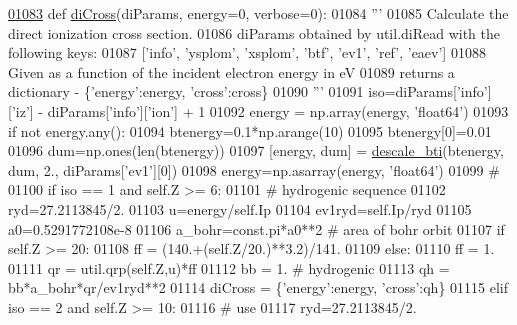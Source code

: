 \begin{DoxyCode}
\hypertarget{namespacepyneb_1_1utils_1_1__chianti__tools_l01083}{}\hyperlink{namespacepyneb_1_1utils_1_1__chianti__tools_a1d4803c6e3b7cbb996b9da3f763ab6ee}{01083} \textcolor{keyword}{def }\hyperlink{namespacepyneb_1_1utils_1_1__chianti__tools_a1d4803c6e3b7cbb996b9da3f763ab6ee}{diCross}(diParams, energy=0, verbose=0):
01084     \textcolor{stringliteral}{'''}
01085 \textcolor{stringliteral}{    Calculate the direct ionization cross section.}
01086 \textcolor{stringliteral}{    diParams obtained by util.diRead with the following keys:}
01087 \textcolor{stringliteral}{    ['info', 'ysplom', 'xsplom', 'btf', 'ev1', 'ref', 'eaev']}
01088 \textcolor{stringliteral}{    Given as a function of the incident electron energy in eV}
01089 \textcolor{stringliteral}{    returns a dictionary - \{'energy':energy, 'cross':cross\}}
01090 \textcolor{stringliteral}{    '''}
01091     iso=diParams[\textcolor{stringliteral}{'info'}][\textcolor{stringliteral}{'iz'}] - diParams[\textcolor{stringliteral}{'info'}][\textcolor{stringliteral}{'ion'}] + 1
01092     energy = np.array(energy, \textcolor{stringliteral}{'float64'})
01093     \textcolor{keywordflow}{if} \textcolor{keywordflow}{not} energy.any():
01094         btenergy=0.1*np.arange(10)
01095         btenergy[0]=0.01
01096         dum=np.ones(len(btenergy))
01097         [energy, dum] = \hyperlink{namespacepyneb_1_1utils_1_1__chianti__tools_a47075ba90f01cbd7a3dbd08115544214}{descale\_bti}(btenergy, dum, 2., diParams[\textcolor{stringliteral}{'ev1'}][0])
01098         energy=np.asarray(energy, \textcolor{stringliteral}{'float64'})
01099     \textcolor{comment}{#}
01100     \textcolor{keywordflow}{if} iso == 1 \textcolor{keywordflow}{and} self.Z >= 6:
01101         \textcolor{comment}{#  hydrogenic sequence}
01102         ryd=27.2113845/2.
01103         u=energy/self.Ip
01104         ev1ryd=self.Ip/ryd
01105         a0=0.5291772108e-8
01106         a\_bohr=const.pi*a0**2   \textcolor{comment}{# area of bohr orbit}
01107         \textcolor{keywordflow}{if} self.Z >= 20:
01108             ff = (140.+(self.Z/20.)**3.2)/141.
01109         \textcolor{keywordflow}{else}:
01110             ff = 1.
01111         qr = util.qrp(self.Z,u)*ff
01112         bb = 1.  \textcolor{comment}{# hydrogenic}
01113         qh = bb*a\_bohr*qr/ev1ryd**2
01114         diCross = \{\textcolor{stringliteral}{'energy'}:energy, \textcolor{stringliteral}{'cross'}:qh\}
01115     \textcolor{keywordflow}{elif} iso == 2 \textcolor{keywordflow}{and} self.Z >= 10:
01116         \textcolor{comment}{#  use}
01117         ryd=27.2113845/2.

\end{DoxyCode}

